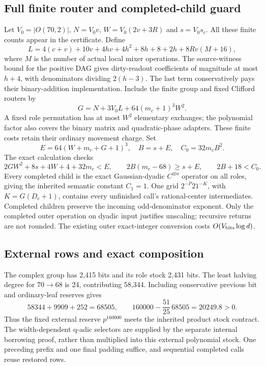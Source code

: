 \subsection{Full finite router and completed-child guard}
Let $V_0=|O(70,2)|$, $N=V_0v$, $W=V_0(2v+3R)$ and $s=V_0s_c$.
All these finite counts appear in the certificate. Define
\[
 L=4(c+v)+10v+4hv+4h^2+8h+8+2h
       +8Rv(M+16),
\]
where $M$ is the number of actual local mixer operations.
The source-witness bound for the positive DAG gives dirty-readout
coefficients of magnitude at most $h+4$, with denominators dividing
$2(h-3)$. The last term conservatively pays their binary-addition
implementation. Include the finite group and fixed Clifford routers by
\[
 G=N+3V_0L+64(m_c+1)^3W^2.
\]
A fixed role permutation has at most $W^2$ elementary exchanges; the
polynomial factor also covers the binary matrix and quadratic-phase
adapters. These finite costs retain their ordinary movement charge.
Set
\[
 E=64(W+m_c+G+1)^3,\quad B=s+E,\quad C_0=32m_cB^2.
\]
The exact calculation checks
\[
 2GW^2+8s+4W+4+32m_c<E,\qquad
 2B(m_c-68)\ge s+E,\qquad 2B+18<C_0.
\]
Every completed child is the exact Gaussian-dyadic $C^{\otimes u}$
operator on all roles, giving the inherited semantic constant $C_1=1$.
One grid $2^{-P}21^{-K}$, with $K=G(D_c+1)$, contains every unfinished
call's rational-center intermediates. Completed children preserve the
incoming odd-denominator exponent. Only the completed outer operation on
dyadic input justifies unscaling; recursive returns are not rounded.
The existing outer exact-integer conversion costs $O(V_{\rm bits}\log d)$.

\subsection{External rows and exact composition}
The complex group has 2,415 bits and its role stock 2,431 bits.
The least halving degree for $70\to68$ is 24, contributing 58,344.
Including conservative previous bit and ordinary-leaf reserves gives
\[
 58344+9909+252=68505,\qquad
 160000-\frac{51}{25}\,68505=20249.8>0.
\]
Thus the fixed external reserve $p^{160000}$ meets the inherited product
stock contract. The width-dependent q-adic selectors are supplied by
the separate internal borrowing proof, rather than multiplied into this
external polynomial stock. One preceding prefix and one final padding
suffice, and sequential completed calls reuse restored rows.


